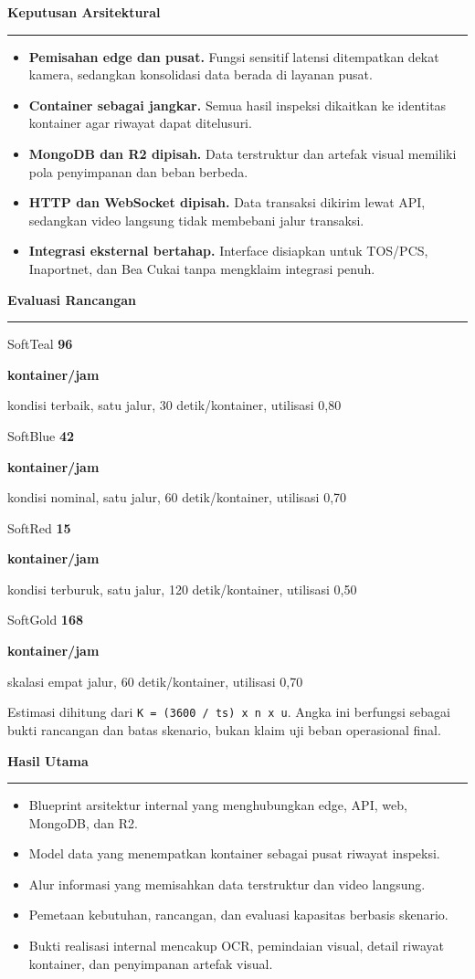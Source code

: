 \documentclass[12pt]{article}
\newcommand{\smallbody}{\fontsize{14.4}{17.8}\selectfont}
\newcommand{\tinybody}{\fontsize{12.0}{14.5}\selectfont}
\newcommand{\boxhead}[1]{%
  {\color{Navy}\bfseries\fontsize{25.0}{29.0}\selectfont #1}\par
  \vspace{1.4mm}
  {\color{Teal}\rule{\linewidth}{1.1pt}}\par
  \vspace{2.4mm}
}
\newcommand{\metric}[4]{%
  \begin{metricbox}{#4}
    {\bfseries\fontsize{26}{29}\selectfont\color{DeepNavy} #1}\par
    {\bfseries\smallbody\color{Ink} #2}\par
    {\tinybody\color{Slate} #3}
  \end{metricbox}
}
\begin{document}
\hfill
\begin{minipage}[t]{0.285\textwidth}
  \vspace{0pt}
  \begin{sectionbox}
    \boxhead{Keputusan Arsitektural}
    \begin{itemize}
      \item \textbf{Pemisahan edge dan pusat.} Fungsi sensitif latensi ditempatkan dekat kamera, sedangkan konsolidasi data berada di layanan pusat.
      \item \textbf{Container sebagai jangkar.} Semua hasil inspeksi dikaitkan ke identitas kontainer agar riwayat dapat ditelusuri.
      \item \textbf{MongoDB dan R2 dipisah.} Data terstruktur dan artefak visual memiliki pola penyimpanan dan beban berbeda.
      \item \textbf{HTTP dan WebSocket dipisah.} Data transaksi dikirim lewat API, sedangkan video langsung tidak membebani jalur transaksi.
      \item \textbf{Integrasi eksternal bertahap.} Interface disiapkan untuk TOS/PCS, Inaportnet, dan Bea Cukai tanpa mengklaim integrasi penuh.
    \end{itemize}
  \end{sectionbox}

  \begin{sectionbox}
    \boxhead{Evaluasi Rancangan}
    \metric{96}{kontainer/jam}{kondisi terbaik, satu jalur, 30 detik/kontainer, utilisasi 0,80}{SoftTeal}
    \metric{42}{kontainer/jam}{kondisi nominal, satu jalur, 60 detik/kontainer, utilisasi 0,70}{SoftBlue}
    \metric{15}{kontainer/jam}{kondisi terburuk, satu jalur, 120 detik/kontainer, utilisasi 0,50}{SoftRed}
    \metric{168}{kontainer/jam}{skalasi empat jalur, 60 detik/kontainer, utilisasi 0,70}{SoftGold}
    \vspace{1mm}
    \smallbody
    Estimasi dihitung dari \texttt{K = (3600 / ts) x n x u}.
    Angka ini berfungsi sebagai bukti rancangan dan batas skenario, bukan klaim
    uji beban operasional final.
  \end{sectionbox}

  \begin{sectionbox}
    \boxhead{Hasil Utama}
    \begin{itemize}
      \item Blueprint arsitektur internal yang menghubungkan edge, API, web, MongoDB, dan R2.
      \item Model data yang menempatkan kontainer sebagai pusat riwayat inspeksi.
      \item Alur informasi yang memisahkan data terstruktur dan video langsung.
      \item Pemetaan kebutuhan, rancangan, dan evaluasi kapasitas berbasis skenario.
      \item Bukti realisasi internal mencakup OCR, pemindaian visual, detail riwayat kontainer, dan penyimpanan artefak visual.
    \end{itemize}
  \end{sectionbox}
\end{minipage}
\end{document}
